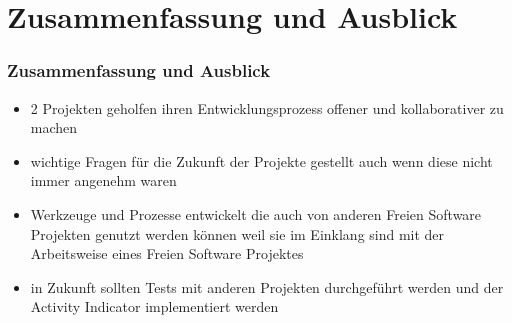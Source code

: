 \documentclass{beamer}
\begin{document}
\section{Zusammenfassung und Ausblick}

\begin{frame}
\frametitle{Zusammenfassung und Ausblick}
\begin{itemize}
 \item 2 Projekten geholfen ihren Entwicklungsprozess offener und kollaborativer zu machen
 \item wichtige Fragen f\"ur die Zukunft der Projekte gestellt auch wenn diese nicht immer angenehm waren
 \item Werkzeuge und Prozesse entwickelt die auch von anderen Freien Software Projekten genutzt werden k\"onnen weil sie im Einklang sind mit der Arbeitsweise eines Freien Software Projektes
 \item in Zukunft sollten Tests mit anderen Projekten durchgeführt werden und der Activity Indicator implementiert werden
\end{itemize}
\end{frame}
\end{document}
